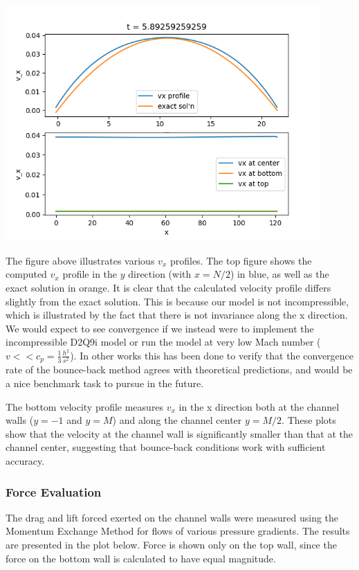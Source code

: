 \documentclass[a4paper]{article}
\begin{document}
\includegraphics[width=12cm]{poisseuille_2.png}

The figure above illustrates various $v_x$ profiles. The top figure shows the computed $v_x$ profile in the $y$ direction (with $x = N/2$) in blue, as well as the exact solution in orange. It is clear that the calculated velocity profile differs slightly from the exact solution. This is because our model is not incompressible, which is illustrated by the fact that there is not invariance along the x direction. We would expect to see convergence if we instead were to implement the incompressible D2Q9i model \cite{ZouHe} or run the model at very low Mach number ($v << c_p = \frac{1}{3}\frac{h^2}{s^2}$). In other works this has been done to verify that the convergence rate of the bounce-back method agrees with theoretical predictions, and would be a nice benchmark task to pursue in the future. \cite{meskas}

The bottom velocity profile measures $v_x$ in the x direction both at the channel walls ($y=-1$ and $y = M$) and along the channel center $y = M/2$. These plots show that the velocity at the channel wall is significantly smaller than that at the channel center, suggesting that bounce-back conditions work with sufficient accuracy. 

\subsubsection{Force Evaluation}
The drag and lift forced exerted on the channel walls were measured using the Momentum Exchange Method for flows of various pressure gradients. The results are presented in the plot below. Force is shown only on the top wall, since the force on the bottom wall is calculated to have equal magnitude. 
\end{document}
